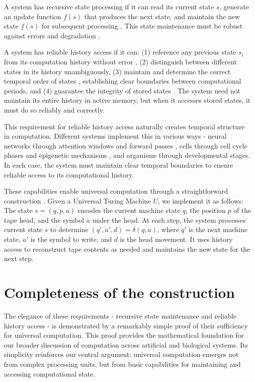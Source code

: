 \documentclass[12pt]{article}
\begin{document}
A system has recursive state processing if it can read its current state $s$, generate an update function $f(s)$ that produces the next state, and maintain the new state $f(s)$ for subsequent processing \cite{manuri2019state}.
This state maintenance must be robust against errors and degradation \cite{yang2013survey}.

A system has reliable history access if it can: (1) reference any previous state $s_i$ from its computation history without error \cite{fu2024memory}, (2) distinguish between different states in its history unambiguously, (3) maintain and determine the correct temporal order of states \cite{berridge2014cell,pastor2020computation}, establishing clear boundaries between computational periods, and (4) guarantee the integrity of stored states \cite{lovkvist2021using}.
The system need not maintain its entire history in active memory, but when it accesses stored states, it must do so reliably and correctly.

This requirement for reliable history access naturally creates temporal structure in computation.
Different systems implement this in various ways - neural networks through attention windows and forward passes \cite{martini2015information,quentin2019differential}, cells through cell cycle phases and epigenetic mechanisms \cite{bruno2022epigenetic}, and organisms through developmental stages.
In each case, the system must maintain clear temporal boundaries to ensure reliable access to its computational history.

These capabilities enable universal computation through a straightforward construction \cite{deutsch1995universality,bennett1989time}.
Given a Universal Turing Machine $U$, we implement it as follows: The state $s = (q, p, a)$ encodes the current machine state $q$, the position $p$ of the tape head, and the symbol $a$ under the head.
At each step, the system processes current state $s$ to determine $(q', a', d) = \delta(q, a)$, where $q'$ is the next machine state, $a'$ is the symbol to write, and $d$ is the head movement.
It uses history access to reconstruct tape contents as needed and maintains the new state for the next step.

\section{Completeness of the construction}

The elegance of these requirements - recursive state maintenance and reliable history access - is demonstrated by a remarkably simple proof of their sufficiency for universal computation. This proof provides the mathematical foundation for our broader discussion of computation across artificial and biological systems. Its simplicity reinforces our central argument: universal computation emerges not from complex processing units, but from basic capabilities for maintaining and accessing computational state.
\end{document}
